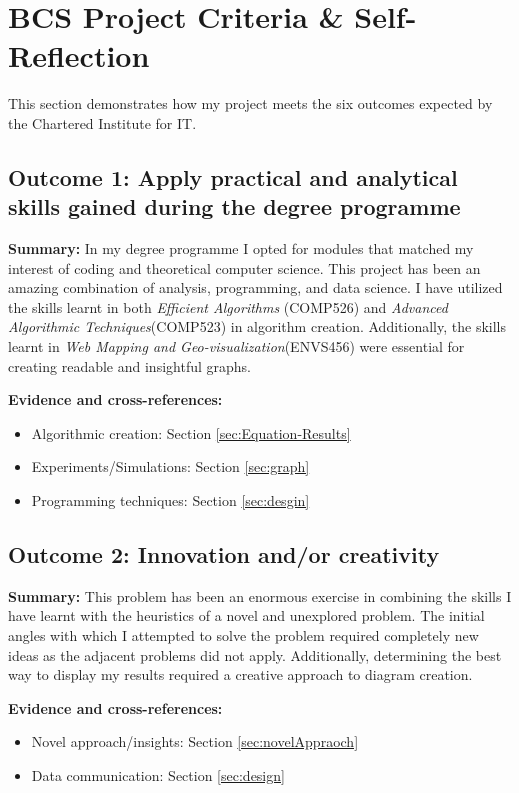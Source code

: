 \documentclass[a4paper,11pt]{article}
\begin{document}
\section{BCS Project Criteria \& Self-Reflection}

This section demonstrates how my project meets the six outcomes expected by the Chartered Institute for IT. 

\subsection*{Outcome 1: Apply practical and analytical skills gained during the degree programme}

\textbf{Summary:} In my degree programme I opted for modules that matched my interest of coding and theoretical computer science. This project has been an amazing combination of analysis, programming, and data science. I have utilized the skills learnt in both \textit{Efficient Algorithms } (COMP526) and \textit{Advanced Algorithmic Techniques}(COMP523) in algorithm creation. Additionally, the skills learnt in \textit{Web Mapping and Geo-visualization}(ENVS456) were essential for creating readable and insightful graphs.

\textbf{Evidence and cross-references:}
\begin{itemize}
\item Algorithmic creation: Section \ref{sec:Equation-Results} 
\item Experiments/Simulations: Section \ref{sec:graph}
\item Programming techniques: Section \ref{sec:desgin}
\end{itemize}

\subsection*{Outcome 2: Innovation and/or creativity}

\textbf{Summary:} This problem has been an enormous exercise in combining the skills I have learnt with the heuristics of a novel and unexplored problem. The initial angles with which I attempted to solve the problem required completely new ideas as the adjacent problems did not apply. Additionally, determining the best way to display my results required a creative approach to diagram creation.

\textbf{Evidence and cross-references:}
\begin{itemize}
\item Novel approach/insights: Section \ref{sec:novelAppraoch} 
\item Data communication: Section \ref{sec:design}
\end{itemize}
\end{document}
